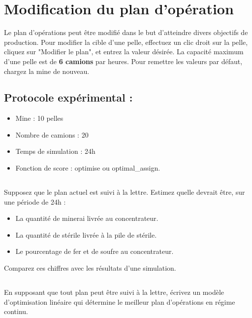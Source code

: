 \documentclass[letterpaper,12pt]{article}
\begin{document}
	\section{Modification du plan d'opération}
	
	Le plan d'opérations peut être modifié dans le but d'atteindre divers objectifs de production. Pour modifier la cible d'une pelle, effectuez un clic droit sur la pelle, cliquez sur "Modifier le plan", et entrez la valeur désirée. La capacité maximum d'une pelle est de \textbf{6 camions} par heures. Pour remettre les valeurs par défaut, chargez la mine de nouveau.
	
	
	
	
	\subsection*{Protocole expérimental : }
	
	\begin{itemize}
		\item Mine : 10 pelles
		\item Nombre de camions : 20
		\item Temps de simulation : 24h
		\item Fonction de score : optimise ou optimal\_assign.
	\end{itemize}
	
	\subsection{}
	Supposez que le plan actuel est suivi à la lettre. Estimez quelle devrait être, sur une période de 24h : 
	
	\begin{itemize}
		\item La quantité de minerai livrée au concentrateur.
		\item La quantité de stérile livrée à la pile de stérile.
		\item Le pourcentage de fer et de soufre au concentrateur.
	\end{itemize}
	
	Comparez ces chiffres avec les résultats d'une simulation.
	
	\subsection{}
	En supposant que tout plan peut être suivi à la lettre, écrivez un modèle d'optimisation linéaire qui détermine le meilleur plan d'opérations en régime continu. 
	
\end{document}
